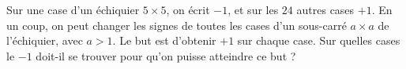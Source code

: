 Sur une case d'un échiquier $5 \times 5$, on écrit $-1$, et sur les $24$ autres cases $+1$. En un coup, on peut changer les signes de toutes les cases d'un sous-carré $a \times a$ de l'échiquier, avec $a > 1$. Le but est d'obtenir $+1$ sur chaque case. Sur quelles cases le $-1$ doit-il se trouver pour qu'on puisse atteindre ce but ?
